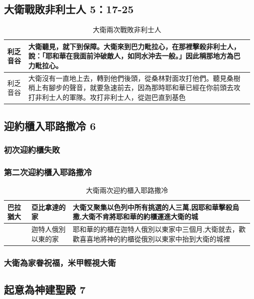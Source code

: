 \newpage
\subsection{大衛戰敗非利士人 5：17-25}

\begin{table}[!hbp]
\centering 
\begin{tabular}{|p{}|p{}|}
\hline
\hline
利乏音谷& 大衛聽見，就下到保障。大衛來到巴力毗拉心，在那裡擊殺非利士人，說：「耶和華在我面前沖破敵人，如同水沖去一般。」因此稱那地方為巴力毗拉心。\\\hline
利乏音谷&大衛沒有一直地上去，轉到他們後頭，從桑林對面攻打他們。聽見桑樹梢上有腳步的聲音，就要急速前去，因為那時耶和華已經在你前頭去攻打非利士人的軍隊。攻打非利士人，從迦巴直到基色 \\\hline
\end{tabular}
\caption{大衛兩次戰敗非利士人}
\end{table}


\subsection{迎約櫃入耶路撒冷 6}
\subsubsection{初次迎約櫃失敗}

\subsubsection{第二次迎約櫃入耶路撒冷}
\begin{table}[!hbp]
\centering 
\begin{tabular}{|p{}|p{}|p{}|}
\hline
\hline
巴拉猶大& 亞比拿達的家 &大衛又聚集以色列中所有挑選的人三萬,因耶和華擊殺烏撒,大衛不肯將耶和華的約櫃運進大衛的城\\\hline
 &迦特人俄別以東的家&耶和華的約櫃在迦特人俄別以東家中三個月,大衛就去，歡歡喜喜地將神的約櫃從俄別以東家中抬到大衛的城裡 \\\hline
\end{tabular}
\caption{大衛兩次迎約櫃入耶路撒冷}
\end{table}
\subsubsection{大衛為家眷祝福，米甲輕視大衛}


\subsection{起意為神建聖殿 7}

